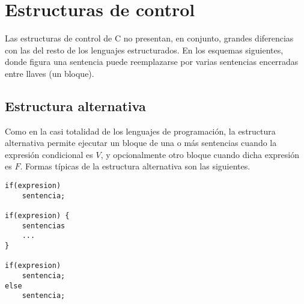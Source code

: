 

\chapter{Estructuras de control}

Las estructuras de control de C no presentan, en conjunto, grandes diferencias
con las del resto de los lenguajes estructurados. En los esquemas siguientes, donde figura una sentencia puede reemplazarse por
varias sentencias encerradas entre llaves (un bloque).

\section{Estructura alternativa}

Como en la casi totalidad de los lenguajes de programación, la estructura alternativa permite ejecutar un bloque de una o más sentencias cuando la expresión condicional es $V$, y opcionalmente otro bloque cuando dicha expresión es $F$.
Formas típicas de la estructura alternativa son las siguientes.

\begin{lstlisting}
if(expresion)
    sentencia;

if(expresion) {
    sentencias
    ...
}

if(expresion)
    sentencia;
else
    sentencia;
\end{lstlisting}

